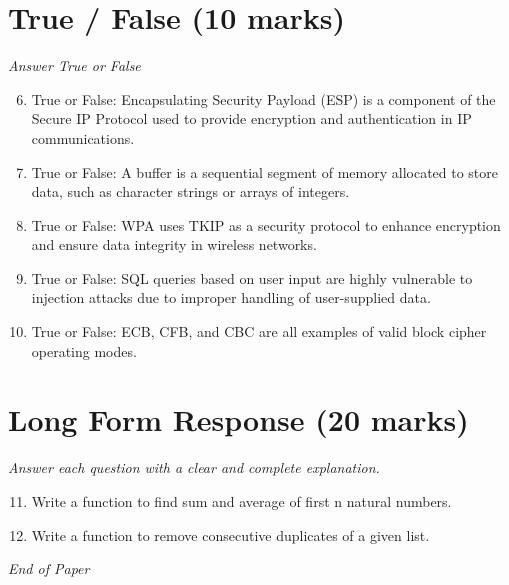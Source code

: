 \documentclass[12pt]{article}
\begin{document}
\section*{True / False (10 marks)}
\textit{Answer True or False}
\begin{enumerate}[label=\arabic*.]
\setcounter{enumi}{5}
\item True or False: Encapsulating Security Payload (ESP) is a component of the Secure IP Protocol used to provide encryption and authentication in IP communications.
\item True or False: A buffer is a sequential segment of memory allocated to store data, such as character strings or arrays of integers.
\item True or False: WPA uses TKIP as a security protocol to enhance encryption and ensure data integrity in wireless networks.
\item True or False: SQL queries based on user input are highly vulnerable to injection attacks due to improper handling of user-supplied data.
\item True or False: ECB, CFB, and CBC are all examples of valid block cipher operating modes.
\end{enumerate}

\section*{Long Form Response (20 marks)}
\textit{Answer each question with a clear and complete explanation.}
\begin{enumerate}[label=\arabic*.]
\setcounter{enumi}{10}
\item Write a function to find sum and average of first n natural numbers.
\item Write a function to remove consecutive duplicates of a given list.
\end{enumerate}

\vfill
\noindent\textit{End of Paper}
\end{document}
